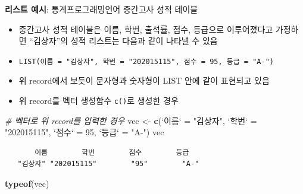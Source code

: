 \documentclass[
  11pt,
]{krantz}
\makeatletter
\newenvironment{Shaded}{\begin{snugshade}}{\end{snugshade}}
\newcommand{\CommentTok}[1]{\textcolor[rgb]{0.37,0.37,0.37}{\textit{#1}}}
\newcommand{\DataTypeTok}[1]{\textcolor[rgb]{0.27,0.27,0.27}{#1}}
\newcommand{\DecValTok}[1]{\textcolor[rgb]{0.06,0.06,0.06}{#1}}
\newcommand{\KeywordTok}[1]{\textcolor[rgb]{0.27,0.27,0.27}{\textbf{#1}}}
\newcommand{\NormalTok}[1]{#1}
\newcommand{\StringTok}[1]{\textcolor[rgb]{0.5,0.5,0.5}{#1}}
\providecommand{\tightlist}{%
  \setlength{\itemsep}{0pt}\setlength{\parskip}{0pt}}
\newenvironment{kframe}{%
\medskip{}
\setlength{\fboxsep}{.8em}
 \def\at@end@of@kframe{}%
 \ifinner\ifhmode%
  \def\at@end@of@kframe{\end{minipage}}%
  \begin{minipage}{\columnwidth}%
 \fi\fi%
 \def\FrameCommand##1{\hskip\@totalleftmargin \hskip-\fboxsep
 \colorbox{shadecolor}{##1}\hskip-\fboxsep
     \hskip-\linewidth \hskip-\@totalleftmargin \hskip\columnwidth}%
 \MakeFramed {\advance\hsize-\width
   \@totalleftmargin\z@ \linewidth\hsize
   \@setminipage}}%
 {\par\unskip\endMakeFramed%
 \at@end@of@kframe}
\newenvironment{rmdblock}[1]
  {
  \begin{itemize}
  \renewcommand{\labelitemi}{
    \raisebox{-.7\height}[0pt][0pt]{
      {\setkeys{Gin}{width=3em,keepaspectratio}\texttt{[image: images/\#1]}}
    }
  }
  \setlength{\fboxsep}{1em}
  \begin{kframe}
  \item
  }
  {
  \end{kframe}
  \end{itemize}
  }
\newenvironment{rmdnote}
  {\begin{rmdblock}{note}}
  {\end{rmdblock}}
\makeatother
\begin{document}
\footnotesize

\begin{rmdnote}
\begin{rmdnote}

\textbf{리스트 예시}: 통계프로그래밍언어 중간고사 성적 테이블

\begin{itemize}
\tightlist
\item
  중간고사 성적 테이블은 이름, 학번, 출석률, 점수, 등급으로 이루어졌다고 가정하면 ``김상자''의 성적 리스트는 다음과 같이 나타낼 수 있음
\item
  \texttt{LIST(이름\ =\ "김상자",\ 학번\ =\ "202015115",\ 점수\ =\ 95,\ 등급\ =\ "A-")}
\item
  위 record에서 보듯이 문자형과 숫자형이 LIST 안에 같이 표현되고 있음
\end{itemize}

\end{rmdnote}
\end{rmdnote}

\normalsize

\begin{itemize}
\tightlist
\item
  위 record를 벡터 생성함수 \texttt{c()}로 생성한 경우
\end{itemize}

\footnotesize

\begin{Shaded}
\begin{Highlighting}[]
\CommentTok{# 벡터로 위 record를 입력한 경우}
\NormalTok{vec <-}\StringTok{ }\KeywordTok{c}\NormalTok{(}\StringTok{`}\DataTypeTok{이름}\StringTok{`}\NormalTok{ =}\StringTok{ "김상자"}\NormalTok{, }\StringTok{`}\DataTypeTok{학번}\StringTok{`}\NormalTok{ =}\StringTok{ "202015115"}\NormalTok{, }
         \StringTok{`}\DataTypeTok{점수}\StringTok{`}\NormalTok{ =}\StringTok{ }\DecValTok{95}\NormalTok{, }\StringTok{`}\DataTypeTok{등급}\StringTok{`}\NormalTok{ =}\StringTok{ "A-"}\NormalTok{)}
\NormalTok{vec}
\end{Highlighting}
\end{Shaded}

\begin{verbatim}
       이름        학번        점수        등급 
   "김상자" "202015115"        "95"        "A-" 
\end{verbatim}

\begin{Shaded}
\begin{Highlighting}[]
\KeywordTok{typeof}\NormalTok{(vec)}
\end{Highlighting}
\end{Shaded}
\end{document}
